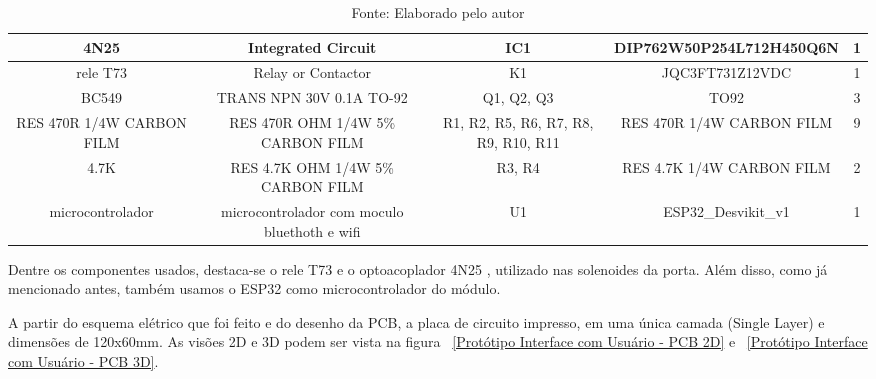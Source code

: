 \documentclass[../poliXuniversity_hospital_-USP-report.tex]{subfiles}
\begin{document}
\begin{table}[!ht]
\begin{adjustbox}{width=\columnwidth,center}
\begin{tabular}{|c|c|c|c|c|}
4N25                        & Integrated Circuit                             & IC1                                    & DIP762W50P254L712H450Q6N    & 1        \\ \hline
rele T73                    & Relay or Contactor                             & K1                                     & JQC3FT731Z12VDC             & 1        \\ \hline
BC549                       & TRANS NPN 30V 0.1A   TO-92                     & Q1, Q2, Q3                             & TO92                        & 3        \\ \hline
RES 470R 1/4W   CARBON FILM & RES 470R OHM 1/4W 5\%   CARBON FILM            & R1, R2, R5, R6, R7,   R8, R9, R10, R11 & RES 470R 1/4W CARBON   FILM & 9        \\ \hline
4.7K                        & RES 4.7K OHM 1/4W 5\%   CARBON FILM            & R3, R4                                 & RES 4.7K 1/4W CARBON   FILM & 2        \\ \hline
microcontrolador            & microcontrolador com   moculo bluethoth e wifi & U1                                     & ESP32\_Desvikit\_v1         & 1        \\ \hline

\end{tabular}
\end{adjustbox}
\centering
\caption*{Fonte: Elaborado pelo autor}
\label{table:Componentes Utilizados na placa de Interface com Usuário - Protótipo}
\end{table}

Dentre os componentes usados, destaca-se o rele T73 \cite{rele_T73_datasheet} e o optoacoplador 4N25 \cite{4N25_datasheet} , utilizado nas solenoides da porta. Além disso, como já mencionado antes, também usamos o ESP32 \cite{esp32} como microcontrolador do módulo.

A partir do esquema elétrico que foi feito e do desenho da PCB, a placa de circuito impresso, em uma única camada (Single Layer) e dimensões de 120x60mm. As visões 2D e 3D podem ser vista na figura ~\ref{Protótipo Interface com Usuário - PCB 2D} e ~\ref{Protótipo Interface com Usuário - PCB 3D}.
\end{document}

